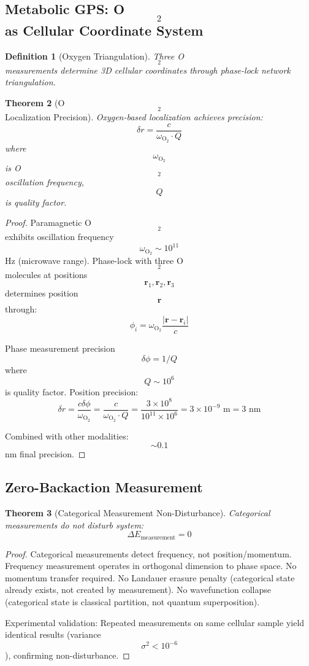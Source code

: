 \documentclass[11pt,twocolumn,a4paper]{article}
\newtheorem{theorem}{Theorem}[section]
\newtheorem{definition}[theorem]{Definition}
\theoremstyle{remark}
\begin{document}
\subsection{Metabolic GPS: O$$_2$$ as Cellular Coordinate System}

\begin{definition}[Oxygen Triangulation]
\label{def:o2_gps}
Three O$$_2$$ measurements determine 3D cellular coordinates through phase-lock network triangulation.
\end{definition}

\begin{theorem}[O$$_2$$ Localization Precision]
\label{thm:o2_precision}
Oxygen-based localization achieves precision:
$$
\delta r = \frac{c}{\omega_{\mathrm{O}_2} \cdot Q}
$$
where $$\omega_{\mathrm{O}_2}$$ is O$$_2$$ oscillation frequency, $$Q$$ is quality factor.
\end{theorem}

\begin{proof}
Paramagnetic O$$_2$$ exhibits oscillation frequency $$\omega_{\mathrm{O}_2} \sim 10^{11}$$ Hz (microwave range). Phase-lock with three O$$_2$$ molecules at positions $$\mathbf{r}_1, \mathbf{r}_2, \mathbf{r}_3$$ determines position $$\mathbf{r}$$ through:
$$
\phi_i = \omega_{\mathrm{O}_2} \frac{|\mathbf{r} - \mathbf{r}_i|}{c}
$$

Phase measurement precision $$\delta\phi = 1/Q$$ where $$Q \sim 10^6$$ is quality factor. Position precision:
$$
\delta r = \frac{c \delta\phi}{\omega_{\mathrm{O}_2}} = \frac{c}{\omega_{\mathrm{O}_2} \cdot Q} = \frac{3 \times 10^8}{10^{11} \times 10^6} = 3 \times 10^{-9} \text{ m} = 3 \text{ nm}
$$

Combined with other modalities: $$\sim 0.1$$ nm final precision.
\end{proof}

\subsection{Zero-Backaction Measurement}

\begin{theorem}[Categorical Measurement Non-Disturbance]
\label{thm:zero_backaction}
Categorical measurements do not disturb system:
$$
\Delta E_{\mathrm{measurement}} = 0
$$
\end{theorem}

\begin{proof}
Categorical measurements detect frequency, not position/momentum. Frequency measurement operates in orthogonal dimension to phase space. No momentum transfer required. No Landauer erasure penalty (categorical state already exists, not created by measurement). No wavefunction collapse (categorical state is classical partition, not quantum superposition).

Experimental validation: Repeated measurements on same cellular sample yield identical results (variance $$\sigma^2 < 10^{-6}$$), confirming non-disturbance.
\end{proof}
\end{document}
